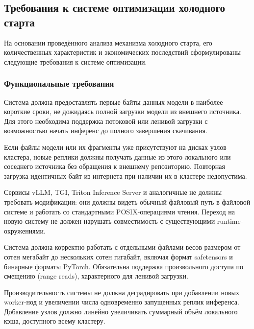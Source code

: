 \subsection{Требования к системе оптимизации холодного старта}

На основании проведённого анализа механизма холодного старта, его количественных характеристик и экономических последствий сформулированы следующие требования к системе оптимизации.

\subsubsection{Функциональные требования}

 Система должна предоставлять первые байты данных модели в наиболее короткие сроки, не дожидаясь полной загрузки модели из внешнего источника. Для этого необходима поддержка потоковой или ленивой загрузки с возможностью начать инференс до полного завершения скачивания.

 Если файлы модели или их фрагменты уже присутствуют на дисках узлов кластера, новые реплики должны получать данные из этого локального или соседнего источника без обращения к внешнему репозиторию. Повторная загрузка идентичных байт из интернета при наличии их в кластере недопустима.

 Сервисы vLLM, TGI, Triton Inference Server и аналогичные не должны требовать модификации: они должны видеть обычный файловый путь в файловой системе и работать со стандартными POSIX-операциями чтения. Переход на новую систему не должен нарушать совместимость с существующими runtime-окружениями.

 Система должна корректно работать с отдельными файлами весов размером от сотен мегабайт до нескольких сотен гигабайт, включая формат safetensors и бинарные форматы PyTorch. Обязательна поддержка произвольного доступа по смещению (range reads), характерного для ленивой загрузки.

 Производительность системы не должна деградировать при добавлении новых worker-нод и увеличении числа одновременно запущенных реплик инференса. Добавление узлов должно линейно увеличивать суммарный объём локального кэша, доступного всему кластеру.

